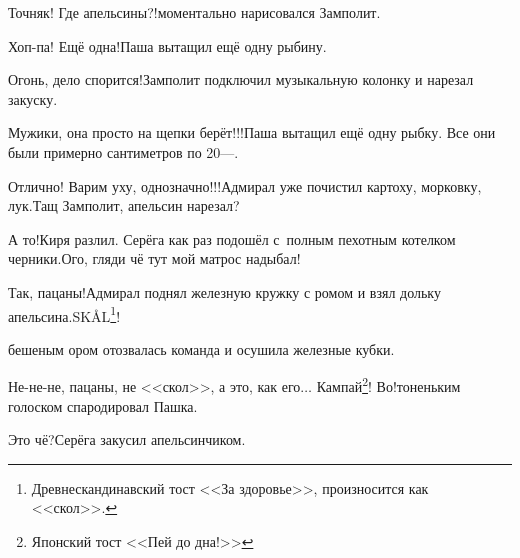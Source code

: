 \diagdash Точняк! Где апельсины?!\mdash моментально нарисовался Замполит.

\diagdash Хоп-па! Ещё одна!\mdash Паша вытащил ещё одну рыбину.

\diagdash Огонь, дело спорится!\mdash Замполит подключил музыкальную колонку и нарезал закуску.

\diagdash Мужики, она просто на щепки берёт!!!\mdash Паша вытащил ещё одну рыбку. Все они были примерно сантиметров по 20\thinspace\nobreakdash---.

\diagdash Отлично! Варим уху, однозначно!!!\mdash Адмирал уже почистил картоху, морковку, лук.\mdash Тащ Замполит, апельсин нарезал?

\diagdash А то!\mdash Киря разлил. Серёга как раз подошёл с~полным пехотным котелком черники.\mdash Ого, гляди чё тут мой матрос надыбал!

\renewcommand*{\thefootnote}{\arabic{footnote}}
\setcounter{footnote}{0}
\diagdash Так, пацаны!\mdash Адмирал поднял железную кружку с ромом и взял дольку апельсина.\mdash SKÅL{\footnote{Древнескандинавский тост <<За здоровье>>, произносится как <<скол>>.}}!

\mdash бешеным ором отозвалась команда и осушила железные кубки.

\diagdash Не-не-не, пацаны, не <<скол>>, а это, как его$\ldots$ Кампай\footnote{Японский тост <<Пей до дна!>>}! Во!\mdash тоненьким голоском спародировал Пашка. 

\diagdash Это чё?\mdash Серёга закусил апельсинчиком.

%

%	
%	
%	

